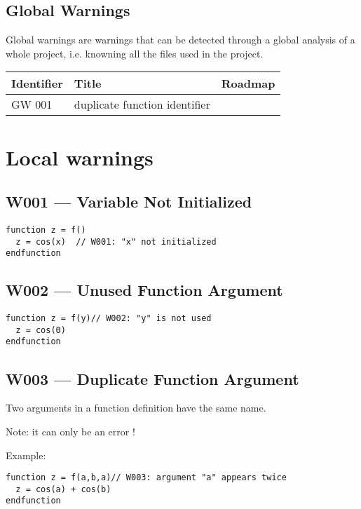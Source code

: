 \documentclass{article}
\begin{document}
\subsection{Global Warnings}

Global warnings are warnings that can be detected through a global
analysis of a whole project, i.e. knowning all the files used in the
project.

\begin{tabular}{|l|l|l|} \hline
Identifier & Title & Roadmap          \\ \hline
GW 001  & duplicate function identifier & \\ \hline
\end{tabular}

\section{Local warnings}

\subsection{W001 --- Variable Not Initialized}

\begin{verbatim}
function z = f()
  z = cos(x)  // W001: "x" not initialized
endfunction
\end{verbatim}

\subsection{W002 --- Unused Function Argument}

\begin{verbatim}
function z = f(y)// W002: "y" is not used
  z = cos(0)  
endfunction
\end{verbatim}

\subsection{W003 --- Duplicate Function Argument}

Two arguments in a function definition have the same name. 

Note: it can only be an error !

Example:
\begin{verbatim}
function z = f(a,b,a)// W003: argument "a" appears twice
  z = cos(a) + cos(b)
endfunction
\end{verbatim}
\end{document}
